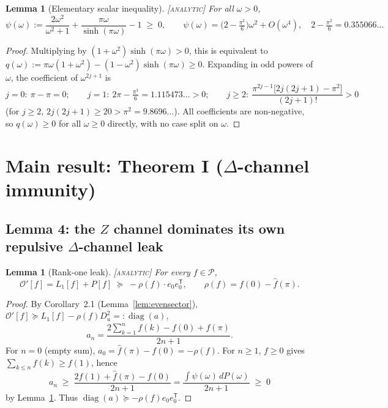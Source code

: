 \documentclass[11pt]{article}
\newtheorem{lemma}[theorem]{Lemma}
\newcommand{\OO}{\mathcal{O}}
\newcommand{\PP}{\mathcal{P}}
\DeclareMathOperator{\diag}{diag}
\begin{document}
\begin{lemma}[Elementary scalar inequality]\label{lem:psi}
\textup{\textsc{[analytic]}} For all $\omega>0$,
\begin{equation}
 \psi(\omega):=\frac{2\omega^2}{\omega^2+1}+\frac{\pi\omega}{\sinh(\pi\omega)}-1\;\ge\;0,
 \qquad \psi(\omega)=\big(2-\tfrac{\pi^2}{6}\big)\omega^2+O(\omega^4),\quad 2-\tfrac{\pi^2}{6}=0.355066\ldots
\end{equation}
\end{lemma}
\begin{proof}
Multiplying by $(1+\omega^2)\sinh(\pi\omega)>0$, this is equivalent to
$q(\omega):=\pi\omega(1+\omega^2)-(1-\omega^2)\sinh(\pi\omega)\ge0$. Expanding
in odd powers of $\omega$, the coefficient of $\omega^{2j+1}$ is
\[
 j=0:\ \pi-\pi=0;\qquad j=1:\ 2\pi-\tfrac{\pi^3}{6}=1.115473\ldots>0;\qquad
 j\ge2:\ \frac{\pi^{2j-1}\big[2j(2j+1)-\pi^2\big]}{(2j+1)!}>0
\]
(for $j\ge2$, $2j(2j+1)\ge20>\pi^2=9.8696\ldots$). All coefficients are
non-negative, so $q(\omega)\ge0$ for all $\omega\ge0$ directly, with no
case split on $\omega$.
\end{proof}

\section{Main result: Theorem I ($\Delta$-channel immunity)}\label{sec:main}

\subsection{Lemma 4: the $Z$ channel dominates its own repulsive $\Delta$-channel leak}

\begin{lemma}[Rank-one leak]\label{lem:leak}
\textup{\textsc{[analytic]}} For every $f\in\PP$,
\begin{equation}\label{eq:lem4}
 \OO'[f]=L_1[f]+P[f]\;\succeq\;-\rho(f)\cdot e_0e_0^{\mathsf T},\qquad \rho(f)=f(0)-\hat f(\pi).
\end{equation}
\end{lemma}
\begin{proof}
By Corollary~2.1 (Lemma~\ref{lem:evensector}), $\OO'[f]\succeq L_1[f]-\rho(f)D_u^2=:\diag(a)$,
\[
 a_n=\frac{2\sum_{k=1}^n f(k)-f(0)+\hat f(\pi)}{2n+1}.
\]
For $n=0$ (empty sum), $a_0=\hat f(\pi)-f(0)=-\rho(f)$. For $n\ge1$, $f\ge0$
gives $\sum_{k\le n}f(k)\ge f(1)$, hence
\[
 a_n\;\ge\;\frac{2f(1)+\hat f(\pi)-f(0)}{2n+1}
 =\frac{\int\psi(\omega)\,dP(\omega)}{2n+1}\;\ge\;0
\]
by Lemma~\ref{lem:psi}. Thus $\diag(a)\succeq-\rho(f)e_0e_0^{\mathsf T}$.
\end{proof}
\end{document}
